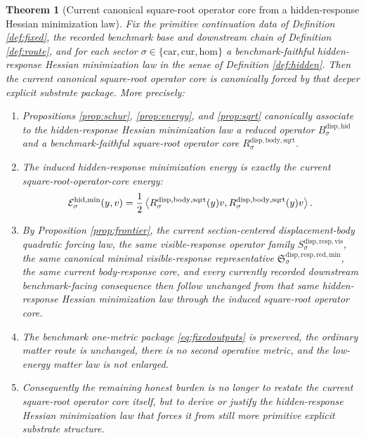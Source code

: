 \documentclass[11pt]{article}
\newcommand{\Car}{\mathrm{car}}
\newcommand{\Cur}{\mathrm{cur}}
\newcommand{\Hom}{\mathrm{hom}}
\newcommand{\VisibleResponseOperator}[1]{S_{#1}^{\mathrm{disp,resp,vis}}}
\newcommand{\MinimalReducedStructure}{\mathfrak S^{\mathrm{disp,resp,red,min}}}
\newcommand{\SquareRootOperator}[1]{R_{#1}^{\mathrm{disp,body,sqrt}}}
\newcommand{\ReducedCoreOperator}[1]{B_{#1}^{\mathrm{disp,hid}}}
\newtheorem{theorem}{Theorem}
\begin{document}
\begin{theorem}[Current canonical square-root operator core from a hidden-response Hessian minimization law]
\label{thm:main}
Fix the primitive continuation data of Definition \ref{def:fixed}, the recorded benchmark base and downstream chain of Definition \ref{def:route}, and for each sector \(\sigma\in\{\Car,\Cur,\Hom\}\) a benchmark-faithful hidden-response Hessian minimization law in the sense of Definition \ref{def:hidden}. Then the current canonical square-root operator core is canonically forced by that deeper explicit substrate package. More precisely:
\begin{enumerate}
    \item Propositions \ref{prop:schur}, \ref{prop:energy}, and \ref{prop:sqrt} canonically associate to the hidden-response Hessian minimization law a reduced operator \(\ReducedCoreOperator{\sigma}\) and a benchmark-faithful square-root operator core \(\SquareRootOperator{\sigma}\).
    \item The induced hidden-response minimization energy is exactly the current square-root-operator-core energy:
    \[
    \mathcal E_{\sigma}^{\mathrm{hid,min}}(y,v)
    =
    \frac{1}{2}
    \ev{
    \SquareRootOperator{\sigma}(y)v,
    \SquareRootOperator{\sigma}(y)v
    }.
    \]
    \item By Proposition \ref{prop:frontier}, the current section-centered displacement-body quadratic forcing law, the same visible-response operator family \(\VisibleResponseOperator{\sigma}\), the same canonical minimal visible-response representative \(\MinimalReducedStructure_{\sigma}\), the same current body-response core, and every currently recorded downstream benchmark-facing consequence then follow unchanged from that same hidden-response Hessian minimization law through the induced square-root operator core.
    \item The benchmark one-metric package \eqref{eq:fixedoutputs} is preserved, the ordinary matter route is unchanged, there is no second operative metric, and the low-energy matter law is not enlarged.
    \item Consequently the remaining honest burden is no longer to restate the current square-root operator core itself, but to derive or justify the hidden-response Hessian minimization law that forces it from still more primitive explicit substrate structure.
\end{enumerate}
\end{theorem}
\end{document}
